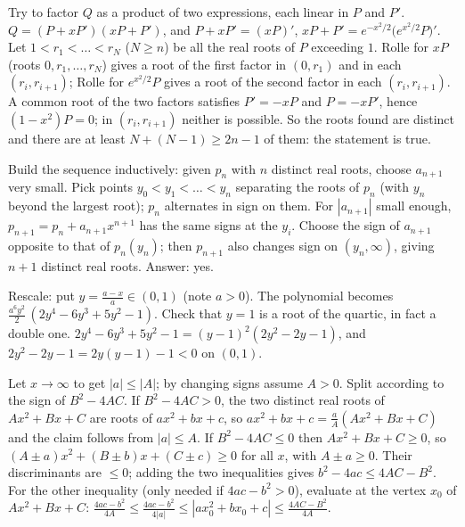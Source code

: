 \documentclass[11pt,a4paper]{article}
\begin{document}
 Try to factor $Q$ as a product of two expressions, each linear in $P$ and $P'$.
 $Q=(P+xP')(xP+P')$, and $P+xP'=(xP)'$, $xP+P'=e^{-x^2/2}\bigl(e^{x^2/2}P\bigr)'$.
 Let $1<r_1<\dots<r_N$ ($N\ge n$) be all the real roots of $P$ exceeding $1$. Rolle for $xP$ (roots $0,r_1,\dots,r_N$) gives a root of the first factor in $(0,r_1)$ and in each $(r_i,r_{i+1})$; Rolle for $e^{x^2/2}P$ gives a root of the second factor in each $(r_i,r_{i+1})$.
 A common root of the two factors satisfies $P'=-xP$ and $P=-xP'$, hence $(1-x^2)P=0$; in $(r_i,r_{i+1})$ neither is possible. So the roots found are distinct and there are at least $N+(N-1)\ge2n-1$ of them: the statement is true.

 Build the sequence inductively: given $p_n$ with $n$ distinct real roots, choose $a_{n+1}$ very small.
 Pick points $y_0<y_1<\dots<y_n$ separating the roots of $p_n$ (with $y_n$ beyond the largest root); $p_n$ alternates in sign on them. For $|a_{n+1}|$ small enough, $p_{n+1}=p_n+a_{n+1}x^{n+1}$ has the same signs at the $y_i$.
 Choose the sign of $a_{n+1}$ opposite to that of $p_n(y_n)$; then $p_{n+1}$ also changes sign on $(y_n,\infty)$, giving $n+1$ distinct real roots. Answer: yes.

 Rescale: put $y=\frac{a-x}a\in(0,1)$ (note $a>0$).
 The polynomial becomes $\frac{a^6y^2}2\,(2y^4-6y^3+5y^2-1)$. Check that $y=1$ is a root of the quartic, in fact a double one.
 $2y^4-6y^3+5y^2-1=(y-1)^2(2y^2-2y-1)$, and $2y^2-2y-1=2y(y-1)-1<0$ on $(0,1)$.

 Let $x\to\infty$ to get $|a|\le|A|$; by changing signs assume $A>0$. Split according to the sign of $B^2-4AC$.
 If $B^2-4AC>0$, the two distinct real roots of $Ax^2+Bx+C$ are roots of $ax^2+bx+c$, so $ax^2+bx+c=\frac aA(Ax^2+Bx+C)$ and the claim follows from $|a|\le A$.
 If $B^2-4AC\le0$ then $Ax^2+Bx+C\ge0$, so $(A\pm a)x^2+(B\pm b)x+(C\pm c)\ge0$ for all $x$, with $A\pm a\ge 0$. Their discriminants are $\le0$; adding the two inequalities gives $b^2-4ac\le4AC-B^2$.
 For the other inequality (only needed if $4ac-b^2>0$), evaluate at the vertex $x_0$ of $Ax^2+Bx+C$: $\frac{4ac-b^2}{4A}\le\frac{4ac-b^2}{4|a|}\le|ax_0^2+bx_0+c|\le\frac{4AC-B^2}{4A}$.
\end{document}
